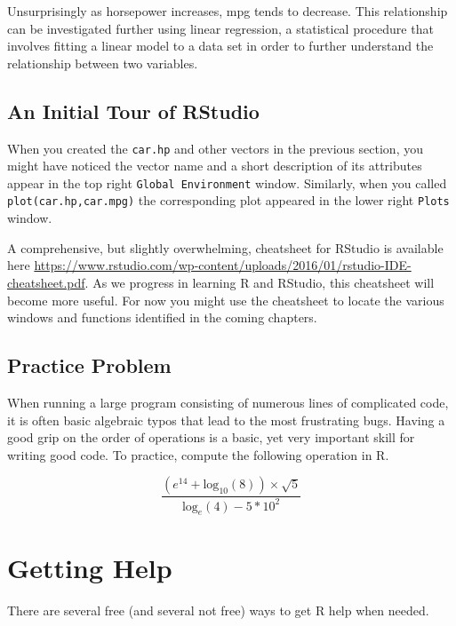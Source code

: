 \documentclass[
]{krantz}
\begin{document}
Unsurprisingly as horsepower increases, mpg tends to decrease. This relationship can be investigated further using linear regression, a statistical procedure that involves fitting a linear model to a data set in order to further understand the relationship between two variables.

\hypertarget{an-initial-tour-of-rstudio}{%
\subsection{An Initial Tour of RStudio}\label{an-initial-tour-of-rstudio}}

When you created the \texttt{car.hp} and other vectors in the previous section, you might have noticed the vector name and a short description of its attributes appear in the top right \texttt{Global\ Environment} window. Similarly, when you called \texttt{plot(car.hp,car.mpg)} the corresponding plot appeared in the lower right \texttt{Plots} window.

A comprehensive, but slightly overwhelming, cheatsheet for RStudio is available here \url{https://www.rstudio.com/wp-content/uploads/2016/01/rstudio-IDE-cheatsheet.pdf}. As we progress in learning R and RStudio, this cheatsheet will become more useful. For now you might use the cheatsheet to locate the various windows and functions identified in the coming chapters.

\hypertarget{practice-problem}{%
\subsection{Practice Problem}\label{practice-problem}}

When running a large program consisting of numerous lines of complicated code, it is often basic algebraic typos that lead to the most frustrating bugs. Having a good grip on the order of operations is a basic, yet very important skill for writing good code. To practice, compute the following operation in R.

\[
\frac{(e^{14} + \text{log}_{10}(8)) \times \sqrt{5}}{\text{log}_{e}(4) - 5 * 10^2}
\]

\hypertarget{getting-help}{%
\section{Getting Help}\label{getting-help}}

There are several free (and several not free) ways to get R help when needed.
\end{document}
